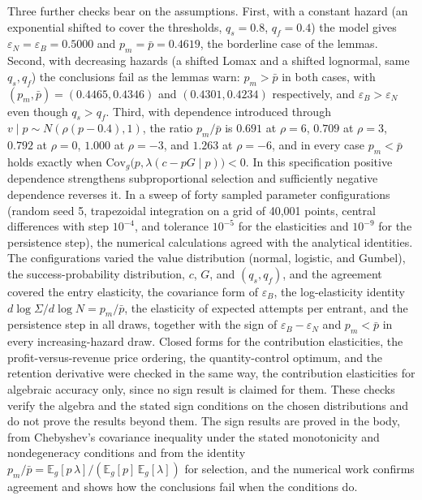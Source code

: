 \documentclass[11pt]{article}
\theoremstyle{remark}
\newcommand{\E}{\mathbb{E}}
\begin{document}
Three further checks bear on the assumptions. First, with a constant hazard (an exponential shifted to cover the thresholds, $q_s=0.8$, $q_f=0.4$) the model gives $\varepsilon_N=\varepsilon_B=0.5000$ and $p_m=\bar p=0.4619$, the borderline case of the lemmas. Second, with decreasing hazards (a shifted Lomax and a shifted lognormal, same $q_s,q_f$) the conclusions fail as the lemmas warn: $p_m>\bar p$ in both cases, with $(p_m,\bar p)=(0.4465,0.4346)$ and $(0.4301,0.4234)$ respectively, and $\varepsilon_B>\varepsilon_N$ even though $q_s>q_f$. Third, with dependence introduced through $v\mid p\sim N(\rho(p-0.4),1)$, the ratio $p_m/\bar p$ is $0.691$ at $\rho=6$, $0.709$ at $\rho=3$, $0.792$ at $\rho=0$, $1.000$ at $\rho=-3$, and $1.263$ at $\rho=-6$, and in every case $p_m<\bar p$ holds exactly when $\mathrm{Cov}_g\bigl(p,\lambda(c-pG\mid p)\bigr)<0$. In this specification positive dependence strengthens subproportional selection and sufficiently negative dependence reverses it. In a sweep of forty sampled parameter configurations (random seed 5, trapezoidal integration on a grid of 40{,}001 points, central differences with step $10^{-4}$, and tolerance $10^{-5}$ for the elasticities and $10^{-9}$ for the persistence step), the numerical calculations agreed with the analytical identities. The configurations varied the value distribution (normal, logistic, and Gumbel), the success-probability distribution, $c$, $G$, and $(q_s,q_f)$, and the agreement covered the entry elasticity, the covariance form of $\varepsilon_B$, the log-elasticity identity $d\log\Sigma/d\log N=p_m/\bar p$, the elasticity of expected attempts per entrant, and the persistence step in all draws, together with the sign of $\varepsilon_B-\varepsilon_N$ and $p_m<\bar p$ in every increasing-hazard draw. Closed forms for the contribution elasticities, the profit-versus-revenue price ordering, the quantity-control optimum, and the retention derivative were checked in the same way, the contribution elasticities for algebraic accuracy only, since no sign result is claimed for them. These checks verify the algebra and the stated sign conditions on the chosen distributions and do not prove the results beyond them. The sign results are proved in the body, from Chebyshev's covariance inequality under the stated monotonicity and nondegeneracy conditions and from the identity $p_m/\bar p=\E_g[p\,\lambda]/(\E_g[p]\,\E_g[\lambda])$ for selection, and the numerical work confirms agreement and shows how the conclusions fail when the conditions do.
\end{document}
